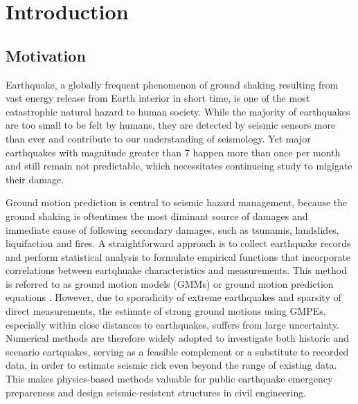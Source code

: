 
\linespread{1.7}
\chapter{Introduction}
\linespread{2.0}
\label{chap:intro}

\section{Motivation}
Earthquake, a globally frequent phenomenon of ground shaking resulting from vast energy release from Earth interior in short time, is one of the most catastrophic natural hazard to human society. While the majority of earthquakes are too small to be felt by humans, they are detected by seismic sensors more than ever and contribute to our understanding of seismology. Yet major earthquakes with magnitude greater than 7 happen more than once per month and still remain not predictable, which necessitates continueing study to migigate their damage.

Ground motion prediction is central to seismic hazard management, because the ground shaking is oftentimes the most diminant source of damages and immediate cause of following secondary damages, such as tsunamis, landslides, liquifaction and fires. A straightforward approach is to collect earthquake records and perform statistical analysis to formulate empirical functions that incorporate correlations between eartqhuake characteristics and measurements. This method is referred to as ground motion models (GMMs) or ground motion prediction equations \citep[GMPEs; e.g., ][]{abrahamsonSummaryASK14Ground2014,booreNGAWest2EquationsPredicting2014,campbellNGAWest2GroundMotion2014,chiouUpdateChiouYoungs2014, idrissNGAWest2EmpiricalModel2014}. However, due to sporadicity of extreme earthquakes and sparsity of direct measurements, the estimate of strong ground motions using GMPEs, especially within close distances to earthquakes, suffers from large uncertainty. Numerical methods are therefore widely adopted to investigate both historic and scenario eartquakes, serving as a feasible complement or a substitute to recorded data, in order to estimate seismic rick even beyond the range of existing data. This makes physics-based methods valuable for public earthquake emergency prepareness and design seismic-resistent structures in civil engineering.

